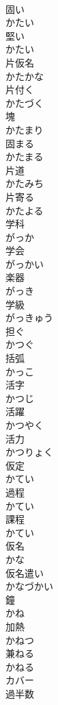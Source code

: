 \documentclass[8pt]{extreport}
\begin{document}
\begin{CJK}{UTF8}{min}
\\	固い 
\\	かたい	
\\	堅い 
\\	かたい	
\\	片仮名 
\\	かたかな	
\\	片付く 
\\	かたづく	
\\	塊 
\\	かたまり	
\\	固まる 
\\	かたまる	
\\	片道 
\\	かたみち	
\\	片寄る 
\\	かたよる	
\\	学科 
\\	がっか	
\\	学会 
\\	がっかい	
\\	楽器 
\\	がっき	
\\	学級 
\\	がっきゅう	
\\	担ぐ 
\\	かつぐ	
\\	括弧 
\\	かっこ	
\\	活字 
\\	かつじ	
\\	活躍 
\\	かつやく	
\\	活力 
\\	かつりょく	
\\	仮定 
\\	かてい	
\\	過程 
\\	かてい	
\\	課程 
\\	かてい	
\\	仮名 
\\	かな	
\\	仮名遣い 
\\	かなづかい	
\\	鐘 
\\	かね	
\\	加熱 
\\	かねつ	
\\	兼ねる 
\\	かねる	
\\	カバー	
\\	過半数 

\end{CJK}
\end{document}
